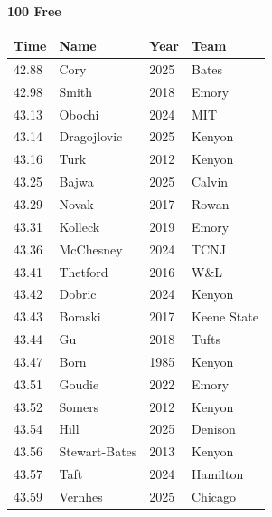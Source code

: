 \noindent\begin{minipage}[t]{0.98\textwidth}
\centering
\textbf{\textcolor{teamprimary}{100 Free}}\par
\vspace{0.5em}
\centering
\small
\renewcommand{\arraystretch}{1.0}
\setlength{\tabcolsep}{4pt}
\begin{tabular}{@{}p{2.5cm}p{4.5cm}p{1.5cm}p{2.5cm}@{}}
\toprule
\textbf{Time} & \textbf{Name} & \textbf{Year} & \textbf{Team} \\
\midrule
42.88 & Cory & 2025 & Bates \\
42.98 & Smith & 2018 & Emory \\
43.13 & Obochi & 2024 & MIT \\
43.14 & Dragojlovic & 2025 & Kenyon \\
43.16 & Turk & 2012 & Kenyon \\
43.25 & Bajwa & 2025 & Calvin \\
43.29 & Novak & 2017 & Rowan \\
43.31 & Kolleck & 2019 & Emory \\
43.36 & McChesney & 2024 & TCNJ \\
43.41 & Thetford & 2016 & W\&L \\
43.42 & Dobric & 2024 & Kenyon \\
43.43 & Boraski & 2017 & Keene State \\
43.44 & Gu & 2018 & Tufts \\
43.47 & Born & 1985 & Kenyon \\
43.51 & Goudie & 2022 & Emory \\
43.52 & Somers & 2012 & Kenyon \\
43.54 & Hill & 2025 & Denison \\
43.56 & Stewart-Bates & 2013 & Kenyon \\
43.57 & Taft & 2024 & Hamilton \\
43.59 & Vernhes & 2025 & Chicago \\
\bottomrule
\end{tabular}
\end{minipage}
\vspace{1.2em}
